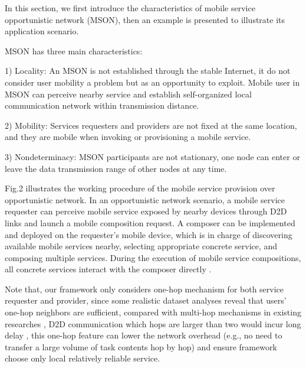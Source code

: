 \documentclass[10pt,journal,compsoc]{IEEEtran}
\begin{document}
In this section, we first introduce the characteristics of mobile service opportunistic network (MSON), then an example is presented to illustrate its application scenario.

MSON has three main characteristics:

1) Locality: An MSON is not established through the stable Internet, it do not consider user mobility a problem but as an opportunity to exploit. Mobile user in MSON can perceive nearby service and establish self-organized local communication network within transmission distance.

2) Mobility: Services requesters and providers are not fixed at the same location, and they are mobile when invoking or provisioning a mobile service.

3) Nondeterminacy: MSON participants are not stationary, one node can enter or leave the data transmission range of other nodes at any time. 

Fig.2 illustrates the working procedure of the mobile service provision over opportunistic network. In an opportunistic network scenario, a mobile service requester can perceive mobile service exposed by nearby devices through D2D links and launch a mobile composition request. A composer can be implemented and deployed on the requester's mobile device, which is in charge of discovering available mobile services nearby, selecting appropriate concrete service, and composing multiple services. During the execution of mobile service compositions, all concrete services interact with the composer directly \cite{Deng2017}.

Note that, our framework only considers one-hop mechanism for both service requester and provider, since some realistic dataset analyses reveal that users' one-hop neighbors are sufficient, compared with multi-hop mechanisms in existing researches \cite{chang2015progressive,karaliopoulos2015user,han2016competition,tuncay2013participant,wu2013homing,jiang2016exploiting,liu2013exploring}, D2D communication which hops are larger than two would incur long delay \cite{li2014can},  this one-hop feature can lower the network overhead (e.g., no need to transfer a large volume of task contents hop by hop) and ensure framework choose only local relatively reliable service. 
\end{document}
